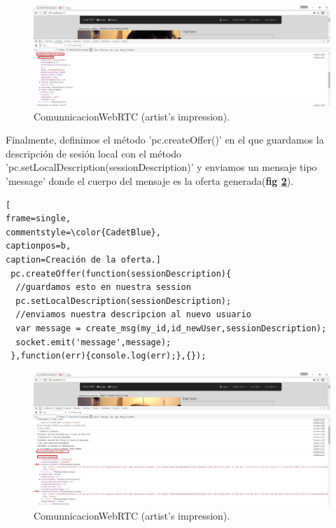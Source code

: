 \begin{figure}[!h]
\centering
\includegraphics[width=0.7\linewidth]{Figures/DataChannelOffert}
\decoRule
\caption[An Electron]{ComunnicacionWebRTC (artist's impression).}
\label{fig:DataChannelOffert}
\end{figure}
Finalmente, definimos el método 'pc.createOffer()' en el que guardamos la descripción de sesión local con el método 'pc.setLocalDescription(sessionDescription)' y enviamos un mensaje tipo 'message' donde el cuerpo del mensaje es la oferta generada(\textbf{fig \ref{fig:OfferCliente}}).
\begin{lstlisting}[
frame=single,
commentstyle=\color{CadetBlue},
captionpos=b,
caption=Creación de la oferta.]
 pc.createOffer(function(sessionDescription){
  //guardamos esto en nuestra session
  pc.setLocalDescription(sessionDescription);
  //enviamos nuestra descripcion al nuevo usuario
  var message = create_msg(my_id,id_newUser,sessionDescription);
  socket.emit('message',message);
 },function(err){console.log(err);},{});
\end{lstlisting}
\begin{figure}[!h]
\centering
\includegraphics[width=0.7\linewidth]{Figures/OfferCliente}
\decoRule
\caption[An Electron]{ComunnicacionWebRTC (artist's impression).}
\label{fig:OfferCliente}
\end{figure}


